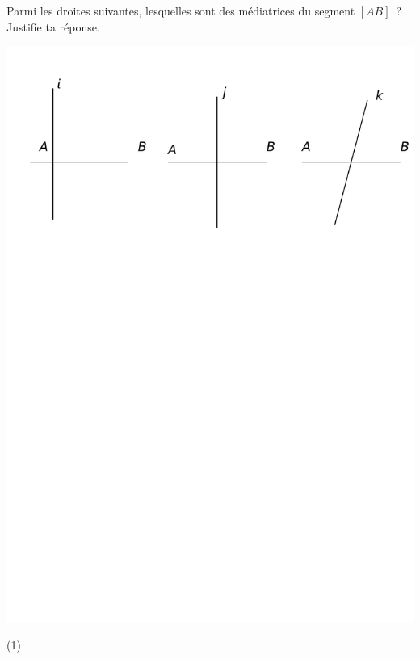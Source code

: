 \documentclass[a4paper,11pt]{report}
\begin{document}
\begin{exop}
	{Parmi les droites suivantes, lesquelles sont des médiatrices du segment $[AB]$~?    Justifie ta réponse.
\begin{center}	
\includegraphics[scale=0.8]{media/es-10/12-4}
\end{center}
   \begin{tasks}(1)
      \task[$i$:] \hrulefill  
      \task[$j$:] \hrulefill 
       \task[$k$:] \hrulefill
\end{tasks}
  \vspace{1cm}
  \begin{center}

\end{center}}
\end{exop}
\end{document}
